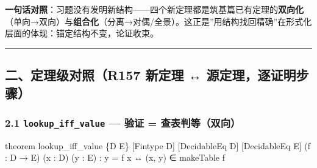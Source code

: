 \documentclass[
]{article}
\newenvironment{Shaded}{}{}
\newcommand{\NormalTok}[1]{#1}
\begin{document}
\textbf{一句话对照}：习题没有发明新结构------四个新定理都是筑基篇已有定理的\textbf{双向化}（单向→双向）与\textbf{组合化}（分离→对偶/全景）。这正是''用结构找回精确''在形式化层面的体现：锚定结构不变，论证收束。

\begin{center}\rule{0.5\linewidth}{0.5pt}\end{center}

\subsection{二、定理级对照（R157 新定理 ↔
源定理，逐证明步骤）}\label{ux4e8cux5b9aux7406ux7ea7ux5bf9ux7167r157-ux65b0ux5b9aux7406-ux6e90ux5b9aux7406ux9010ux8bc1ux660eux6b65ux9aa4}

\subsubsection{\texorpdfstring{2.1 \texttt{lookup\_iff\_value} --- 验证
=
查表判等（双向）}{2.1 lookup\_iff\_value --- 验证 = 查表判等（双向）}}\label{lookup_iff_value-ux9a8cux8bc1-ux67e5ux8868ux5224ux7b49ux53ccux5411}

\begin{Shaded}
\begin{Highlighting}[]
\NormalTok{theorem lookup\_iff\_value \{D E\} [Fintype D] [DecidableEq D] [DecidableEq E]}
\NormalTok{    (f : D → E) (x : D) (y : E) : y = f x ↔ (x, y) ∈ makeTable f}
\end{Highlighting}
\end{Shaded}
\end{document}
